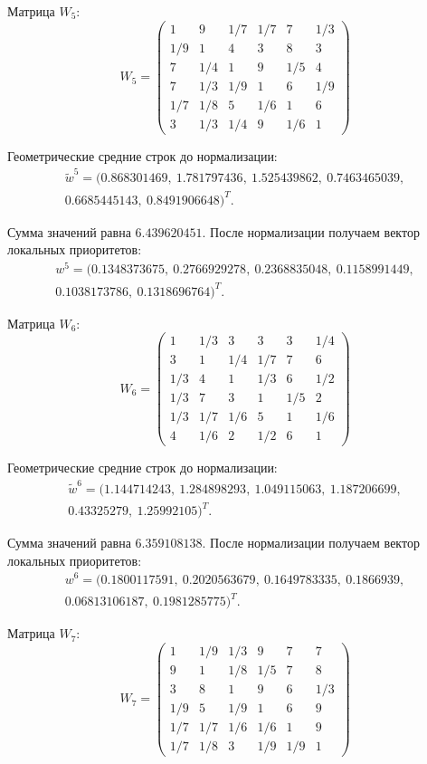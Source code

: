 Матрица $W_5$:
\[
W_5 = \begin{pmatrix}
1 & 9 & 1/7 & 1/7 & 7 & 1/3 \\
1/9 & 1 & 4 & 3 & 8 & 3 \\
7 & 1/4 & 1 & 9 & 1/5 & 4 \\
7 & 1/3 & 1/9 & 1 & 6 & 1/9 \\
1/7 & 1/8 & 5 & 1/6 & 1 & 6 \\
3 & 1/3 & 1/4 & 9 & 1/6 & 1
\end{pmatrix}
\]

Геометрические средние строк до нормализации:
\begin{gather*}
\tilde{w}^5 = (0.868301469,\ 1.781797436,\ 1.525439862,\ 0.7463465039,\\ 0.6685445143,\ 0.8491906648)^T.
\end{gather*}

Сумма значений равна $6.439620451$. После нормализации получаем вектор локальных приоритетов:
\begin{gather*}
w^5 = (0.1348373675,\ 0.2766929278,\ 0.2368835048,\ 0.1158991449,\\ 0.1038173786,\ 0.1318696764)^T.
\end{gather*}


Матрица $W_6$:
\[
W_6 = \begin{pmatrix}
1 & 1/3 & 3 & 3 & 3 & 1/4 \\
3 & 1 & 1/4 & 1/7 & 7 & 6 \\
1/3 & 4 & 1 & 1/3 & 6 & 1/2 \\
1/3 & 7 & 3 & 1 & 1/5 & 2 \\
1/3 & 1/7 & 1/6 & 5 & 1 & 1/6 \\
4 & 1/6 & 2 & 1/2 & 6 & 1
\end{pmatrix}
\]

Геометрические средние строк до нормализации:
\begin{gather*}
\tilde{w}^6 = (1.144714243,\ 1.284898293,\ 1.049115063,\ 1.187206699,\\ 0.43325279,\ 1.25992105)^T.
\end{gather*}

Сумма значений равна $6.359108138$. После нормализации получаем вектор локальных приоритетов:
\begin{gather*}
w^6 = (0.1800117591,\ 0.2020563679,\ 0.1649783335,\ 0.1866939,\\ 0.06813106187,\ 0.1981285775)^T.
\end{gather*}


Матрица $W_7$:
\[
W_7 = \begin{pmatrix}
1 & 1/9 & 1/3 & 9 & 7 & 7 \\
9 & 1 & 1/8 & 1/5 & 7 & 8 \\
3 & 8 & 1 & 9 & 6 & 1/3 \\
1/9 & 5 & 1/9 & 1 & 6 & 9 \\
1/7 & 1/7 & 1/6 & 1/6 & 1 & 9 \\
1/7 & 1/8 & 3 & 1/9 & 1/9 & 1
\end{pmatrix}
\]


